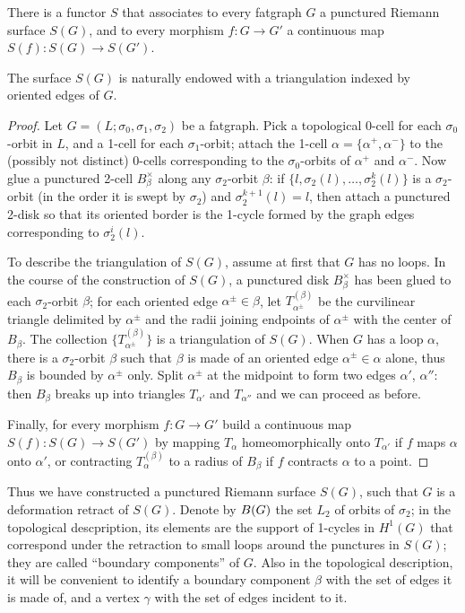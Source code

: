 \begin{lemma}
  \label{lemma:S-functor}
  \begin{inparaenum}
  \item There is a functor $S$ that associates to every fatgraph
    $G$ a punctured Riemann surface $S(G)$, and to every morphism $f:
    G \to G'$ a continuous map $S(f): S(G) \to S(G')$.
  \item The surface $S(G)$ is naturally endowed with a triangulation
    indexed by oriented edges of $G$.
  \end{inparaenum}
\end{lemma}
\begin{proof}
  Let $G = (L; \sigma_0, \sigma_1, \sigma_2)$ be a fatgraph.  Pick a
  topological 0-cell for each $\sigma_0$-orbit in $L$, and a 1-cell
  for each $\sigma_1$-orbit; attach the 1-cell $\alpha = \{\alpha^+,
  \alpha^-\}$ to the (possibly not distinct) 0-cells corresponding to
  the $\sigma_0$-orbits of $\alpha^+$ and $\alpha^-$.  Now glue a
  punctured 2-cell $B_\beta^\times$ along any $\sigma_2$-orbit
  $\beta$: if $\{l, \sigma_2(l), \ldots, \sigma_2^k(l)\}$ is a
  $\sigma_2$-orbit (in the order it is swept by $\sigma_2$) and
  $\sigma_2^{k+1}(l) = l$, then attach a punctured 2-disk so that its
  oriented border is the 1-cycle formed by the graph edges
  corresponding to $\sigma_2^i(l)$.

  To describe the triangulation of $S(G)$, assume at first that $G$
  has no loops.  In the course of the construction of $S(G)$, a
  punctured disk $B_\beta^\times$ has been glued to each
  $\sigma_2$-orbit $\beta$; for each oriented edge $\alpha^\pm \in
  \beta$, let $T_{\alpha^\pm}^{(\beta)}$ be the curvilinear triangle
  delimited by $\alpha^\pm$ and the radii joining endpoints of
  $\alpha^\pm$ with the center of $B_\beta$.  The collection $\{
  T_{\alpha^\pm}^{(\beta)} \}$ is a triangulation of $S(G)$.  When $G$
  has a loop $\alpha$, there is a $\sigma_2$-orbit $\beta$ such that
  $\beta$ is made of an oriented edge $\alpha^\pm \in \alpha$ alone,
  thus $B_\beta$ is bounded by $\alpha^\pm$ only.  Split $\alpha^\pm$
  at the midpoint to form two edges $\alpha'$, $\alpha''$: then
  $B_\beta$ breaks up into triangles $T_{\alpha'}$ and $T_{\alpha''}$
  and we can proceed as before.

  Finally, for every morphism $f: G \to G'$ build a continuous map
  $S(f): S(G) \to S(G')$ by mapping $T_\alpha$ homeomorphically onto $T_{\alpha'}$
  if $f$ maps $\alpha$ onto $\alpha'$, or contracting $T_\alpha^{(\beta)}$ to a radius of
  $B_\beta$ if $f$ contracts $\alpha$ to a point.
\end{proof}
Thus we have constructed a punctured Riemann surface $S(G)$, such that
$G$ is a deformation retract of $S(G)$.  Denote by $B(G)$ the set
$L_2$ of orbits of $\sigma_2$; in the topological descpription, its
elements are the support of 1-cycles in $H^1(G)$ that correspond under
the retraction to small loops around the punctures in $S(G)$; they are
called ``boundary components'' of $G$.  Also in the topological
description, it will be convenient to identify a boundary component
$\beta$ with the set of edges it is made of, and a vertex $\gamma$ with the set
of edges incident to it.


